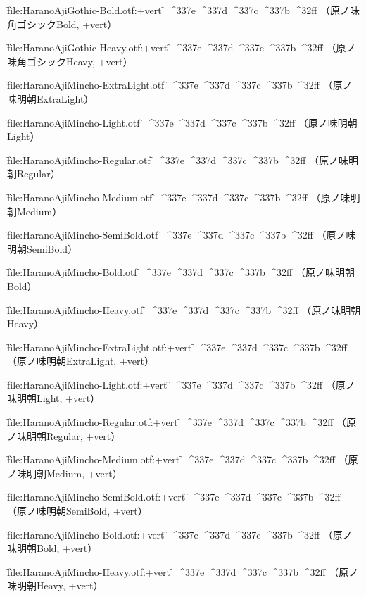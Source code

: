 \font\f{file:HaranoAjiGothic-Bold.otf:+vert} \f
^^^^337e
^^^^337d
^^^^337c
^^^^337b
^^^^32ff
（原ノ味角ゴシックBold, +vert）\par

\font\f{file:HaranoAjiGothic-Heavy.otf:+vert} \f
^^^^337e
^^^^337d
^^^^337c
^^^^337b
^^^^32ff
（原ノ味角ゴシックHeavy, +vert）\par

\font\f{file:HaranoAjiMincho-ExtraLight.otf} \f
^^^^337e
^^^^337d
^^^^337c
^^^^337b
^^^^32ff
（原ノ味明朝ExtraLight）\par

\font\f{file:HaranoAjiMincho-Light.otf} \f
^^^^337e
^^^^337d
^^^^337c
^^^^337b
^^^^32ff
（原ノ味明朝Light）\par

\font\f{file:HaranoAjiMincho-Regular.otf} \f
^^^^337e
^^^^337d
^^^^337c
^^^^337b
^^^^32ff
（原ノ味明朝Regular）\par

\font\f{file:HaranoAjiMincho-Medium.otf} \f
^^^^337e
^^^^337d
^^^^337c
^^^^337b
^^^^32ff
（原ノ味明朝Medium）\par

\font\f{file:HaranoAjiMincho-SemiBold.otf} \f
^^^^337e
^^^^337d
^^^^337c
^^^^337b
^^^^32ff
（原ノ味明朝SemiBold）\par

\font\f{file:HaranoAjiMincho-Bold.otf} \f
^^^^337e
^^^^337d
^^^^337c
^^^^337b
^^^^32ff
（原ノ味明朝Bold）\par

\font\f{file:HaranoAjiMincho-Heavy.otf} \f
^^^^337e
^^^^337d
^^^^337c
^^^^337b
^^^^32ff
（原ノ味明朝Heavy）\par


\font\f{file:HaranoAjiMincho-ExtraLight.otf:+vert} \f
^^^^337e
^^^^337d
^^^^337c
^^^^337b
^^^^32ff
（原ノ味明朝ExtraLight, +vert）\par

\font\f{file:HaranoAjiMincho-Light.otf:+vert} \f
^^^^337e
^^^^337d
^^^^337c
^^^^337b
^^^^32ff
（原ノ味明朝Light, +vert）\par

\font\f{file:HaranoAjiMincho-Regular.otf:+vert} \f
^^^^337e
^^^^337d
^^^^337c
^^^^337b
^^^^32ff
（原ノ味明朝Regular, +vert）\par

\font\f{file:HaranoAjiMincho-Medium.otf:+vert} \f
^^^^337e
^^^^337d
^^^^337c
^^^^337b
^^^^32ff
（原ノ味明朝Medium, +vert）\par

\font\f{file:HaranoAjiMincho-SemiBold.otf:+vert} \f
^^^^337e
^^^^337d
^^^^337c
^^^^337b
^^^^32ff
（原ノ味明朝SemiBold, +vert）\par

\font\f{file:HaranoAjiMincho-Bold.otf:+vert} \f
^^^^337e
^^^^337d
^^^^337c
^^^^337b
^^^^32ff
（原ノ味明朝Bold, +vert）\par

\font\f{file:HaranoAjiMincho-Heavy.otf:+vert} \f
^^^^337e
^^^^337d
^^^^337c
^^^^337b
^^^^32ff
（原ノ味明朝Heavy, +vert）\par

\bye
